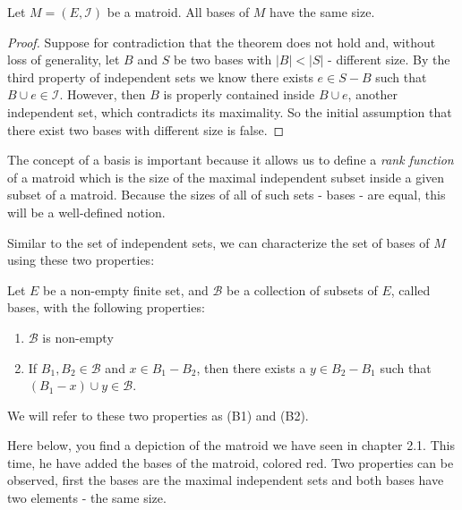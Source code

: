 \begin{theorem}
    Let $M = (E, \mathcal{I})$ be a matroid. All bases of $M$ have the same size.
\end{theorem}

\begin{proof}
    Suppose for contradiction that the theorem does not hold and, without loss of generality, let $B$ and $S$ be two bases with $|B| < |S|$ - different size. By the third property of independent sets we know there exists $e \in S - B$ such that $ B \cup e \in \mathcal{I}$. However, then $B$ is properly contained inside $B \cup e$, another independent set, which contradicts its maximality. So the initial assumption that there exist two bases with different size is false.
\end{proof}

The concept of a basis is important because it allows us to define a \textit{rank function} of a matroid which is the size of the maximal independent subset inside a given subset of a matroid.  Because the sizes of all of such sets - bases - are equal, this will be a well-defined notion.

Similar to the set of independent sets, we can characterize the set of bases of $M$ using these two properties:

\begin{defn}
    Let $E$ be a non-empty finite set, and $\mathcal{B}$ be a collection of subsets of $E$, called bases, with the following properties:
    \begin{enumerate}
        \item $\mathcal{B}$ is non-empty
        \item If $B_1,B_2\in\mathcal{B}$ and $x\in B_1 - B_2$, then there exists a $y\in B_2 - B_1$ such that $(B_1 - x)\cup y \in\mathcal{B}$.
    \end{enumerate}
    We will refer to these two properties as (B1) and (B2).
\end{defn}
Here below, you find a depiction of the matroid we have seen in chapter 2.1. This time, he have added the bases of the matroid, colored red. Two properties can be observed, first the bases are the maximal independent sets and both bases have two elements - the same size.

